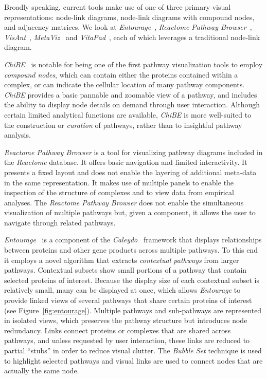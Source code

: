 \documentclass[review,journal]{vgtc}         %
\begin{document}
Broadly speaking, current tools make use of one of three primary visual representations: node-link diagrams, node-link diagrams with compound nodes, and adjacency matrices. We look at \textit{Entourage}~\cite{Lex2013entourage}, \textit{Reactome Pathway Browser}~\cite{croft2014reactome}, \textit{VisAnt}~\cite{hu2004visant}, \textit{MetaViz}~\cite{bourqui2007metabolic} and \textit{VitaPad}~\cite{holford2005vitapad}, each of which leverages a traditional node-link diagram. 

\emph{ChiBE}~\cite{Babur2010chibe} is notable for being one of the first pathway visualization tools to employ \emph{compound nodes}, which can contain either the proteins contained within a complex, or can indicate the cellular location of many pathway components. \emph{ChiBE} provides a basic pannable and zoomable view of a pathway, and includes the ability to display node details on demand through user interaction. Although certain limited analytical functions are available, \emph{ChiBE} is more well-suited to the construction or \emph{curation} of pathways, rather than to insightful pathway analysis.

\textit{Reactome Pathway Browser} is a tool for visualizing pathway diagrams included in the \textit{Reactome} database. It offers basic navigation and limited interactivity. It presents a fixed layout and does not enable the layering of additional meta-data in the same representation. It makes use of multiple panels to enable the inspection of the structure of complexes and to view data from empirical analyses. The \textit{Reactome Pathway Browser} does not enable the simultaneous visualization of multiple pathways but, given a component, it allows the user to navigate through related pathways.

\emph{Entourage}~\cite{Lex2013entourage} is a component of the \emph{Caleydo}~\cite{Lex2010caleydo} framework that displays relationships between proteins and other gene products across multiple pathways. To this end it employs a novel algorithm that extracts \emph{contextual pathways} from larger pathways. Contextual subsets show small portions of a pathway that contain selected proteins of interest. Because the display size of each contextual subset is relatively small, many can be displayed at once, which allows \emph{Entourage} to provide linked views of several pathways that share certain proteins of interest (see Figure~\ref{fig:entourage}). Multiple pathways and sub-pathways are represented in isolated views, which preserves the pathway structure but introduces node redundancy. Links connect proteins or complexes that are shared across pathways, and unless requested by user interaction, these links are reduced to partial ``stubs'' in order to reduce visual clutter. The \textit{Bubble Set} technique is used to highlight selected pathways and visual links are used to connect nodes that are actually the same node.
\end{document}
